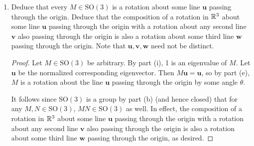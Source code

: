 \documentclass[../psets.tex]{subfiles}
\begin{document}
\begin{enumerate}
\begin{enumerate}
\begin{proof}
            If $M^{-1}=M^T$, then $\sigma(M^{-1})=\sigma(M^T)$\footnote{$\sigma(A)$ denotes the \textbf{spectrum} of $A$, i.e., the set of all eigenvalues of the matrix $A$.}. Additionally, by part (h), $\sigma(M)=\sigma(M^T)$, so in this case, transitivity implies that $\sigma(M)=\sigma(M^{-1})$. Furthermore, part (h) asserts that for every $\lambda\in\sigma(M)$, we have that $\lambda^{-1}\in\sigma(M^{-1})$. Combining this with the above, we have that $\lambda\in\sigma(M)$ implies that $\lambda^{-1}\in\sigma(M)$.\par
            Now suppose $\lambda_1,\lambda_2,\lambda_3$ are eigenvalues of $M$. Note that these eigenvalues need not be distinct, but they do exist (every linear transformation has at least one [possibly complex] eigenvalue). Since the inverses of each of these eigenvalues are amongst the set, too, WLOG let $\lambda_2=\lambda_1^{-1}$. It follows that
            \begin{equation*}
                1 = \det(M)
                = \lambda_1\lambda_2\lambda_3
                = \lambda_1\lambda_1^{-1}\lambda_3
                = \lambda_3
            \end{equation*}
            as desired.
        \end{proof}
        \item Deduce that every $M\in\text{SO}(3)$ is a rotation about some line $\mathbf{u}$ passing through the origin. Deduce that the composition of a rotation in $\mathbb{R}^3$ about some line $\mathbf{u}$ passing through the origin with a rotation about any second line $\mathbf{v}$ also passing through the origin is also a rotation about some third line $\mathbf{w}$ passing through the origin. Note that $\mathbf{u},\mathbf{v},\mathbf{w}$ need not be distinct.
        \begin{proof}
            Let $M\in\text{SO}(3)$ be arbitrary. By part (i), 1 is an eigenvalue of $M$. Let $\mathbf{u}$ be the normalized corresponding eigenvector. Then $M\mathbf{u}=\mathbf{u}$, so by part (e), $M$ is a rotation about the line $\mathbf{u}$ passing through the origin by some angle $\theta$.\par
            It follows since $\text{SO}(3)$ is a group by part (b) (and hence closed) that for any $M,N\in\text{SO}(3)$, $MN\in\text{SO}(3)$ as well. In effect, the composition of a rotation in $\mathbb{R}^3$ about some line $\mathbf{u}$ passing through the origin with a rotation about any second line $\mathbf{v}$ also passing through the origin is also a rotation about some third line $\mathbf{w}$ passing through the origin, as desired.
        \end{proof}
    \end{enumerate}
\end{enumerate}
\end{document}
